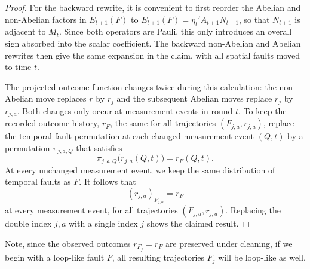 \documentclass[11pt]{article}
\begin{document}
\begin{proof}
    For the backward rewrite, it is convenient to first reorder the Abelian and non-Abelian factors in $E_{t+1}(F)$ to $E_{t+1}(F) =\eta_t' A_{t+1}N_{t+1}$, so that $N_{t+1}$ is adjacent to $M_t$.
    Since both operators are Pauli, this only introduces an overall sign absorbed into the scalar coefficient.
    The backward non-Abelian and Abelian rewrites then give the same expansion in the claim, with all spatial faults moved to time $t$.

    The projected outcome function changes twice during this calculation: the non-Abelian move replaces $r$ by $r_j$ and the subsequent Abelian moves replace $r_j$ by $r_{j,a}$. Both changes only occur at measurement events in round $t$.
    To keep the recorded outcome history, $r_F$, the same for all trajectories $(F_{j,a},r_{j,a})$, replace the temporal fault permutation at each changed measurement event $(Q,t)$ by a permutation $\pi_{j,a,Q}$ that satisfies
    \[
    \pi_{j,a,Q}\bigl(r_{j,a}(Q,t)\bigr) = r_F(Q,t).
    \]
    At every unchanged measurement event, we keep the same distribution of temporal faults as $F$.
    It follows that \[
    (r_{j,a})_{F_{j,a}} = r_F
    \]
    at every measurement event, for all trajectories $(F_{j,a},r_{j,a})$.
    Replacing the double index $j,a$ with a single index $j$ shows the claimed result.    
\end{proof}

\begin{remark}
    Note, since the observed outcomes $r_{F_j}=r_F$ are preserved under cleaning, if we begin with a loop-like fault $F$, all resulting trajectories $F_j$ will be loop-like as well.
\end{remark}
\end{document}
